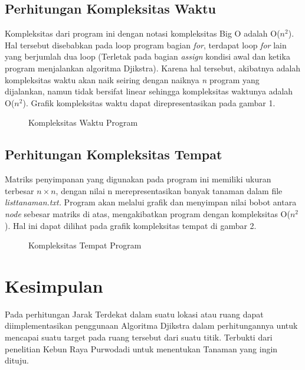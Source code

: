 \documentclass[conference]{IEEEtran}
\begin{document}
\subsection{Perhitungan Kompleksitas Waktu}
Kompleksitas dari program ini dengan notasi kompleksitas
Big O adalah O(\(n^2\)). Hal tersebut disebabkan pada loop
program bagian \emph{for}, terdapat loop \emph{for} lain yang berjumlah
dua loop (Terletak pada bagian \emph{assign} kondisi awal dan ketika
program menjalankan algoritma Djikstra). Karena hal tersebut,
akibatnya adalah kompleksitas waktu akan naik seiring dengan
naiknya \emph{n} program yang dijalankan, namun tidak bersifat
linear sehingga kompleksitas waktunya adalah O(\(n^2\)). Grafik
kompleksitas waktu dapat direpresentasikan pada gambar 1.

\begin{figure}[htbp]
    \centering
    \scalebox{0.3}{}
    \caption{Kompleksitas Waktu Program}
\end{figure}

\subsection{Perhitungan Kompleksitas Tempat}
Matriks penyimpanan yang digunakan pada program ini
memiliki ukuran terbesar \(n \times  n\), dengan nilai n merepresentasikan banyak tanaman dalam file \emph{listtanaman.txt.} Program
akan melalui grafik dan menyimpan nilai bobot antara \emph{node}
sebesar matriks di atas, mengakibatkan program dengan kompleksitas O(\(n^2\)). Hal ini dapat dilihat pada grafik kompleksitas
tempat di gambar 2.

\begin{figure}[htbp]
    \centering
    \scalebox{0.3}{}
    \caption{Kompleksitas Tempat Program}
\end{figure}

\section{Kesimpulan}
Pada perhitungan Jarak Terdekat dalam suatu lokasi atau ruang dapat diimplementasikan penggunaan Algoritma Djikstra
dalam perhitungannya untuk mencapai suatu target pada ruang
tersebut dari suatu titik. Terbukti dari penelitian Kebun Raya
Purwodadi untuk menentukan Tanaman yang ingin dituju.



\end{document}
